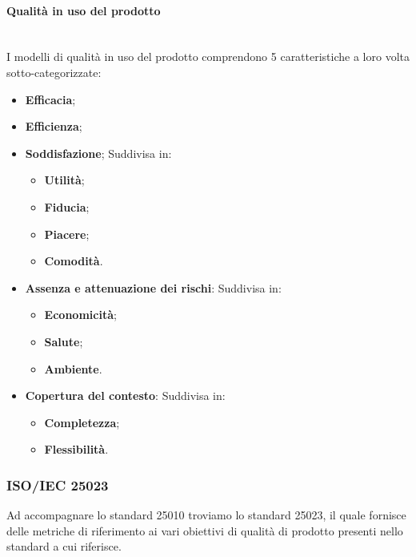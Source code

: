\paragraph {Qualità in uso del prodotto}\mbox{}\\
I modelli di qualità in uso del prodotto comprendono 5 caratteristiche a loro volta sotto-categorizzate:
\begin{itemize}
	\item \textbf{Efficacia};
	\item \textbf{Efficienza};
	\item \textbf{Soddisfazione};
	Suddivisa in:
	\begin{itemize}
		\item \textbf{Utilità};
		\item \textbf{Fiducia};
		\item \textbf{Piacere};
		\item \textbf{Comodità}.
	\end{itemize}
	\item \textbf{Assenza e attenuazione dei rischi}: Suddivisa in:
	\begin{itemize}
		\item \textbf{Economicità};
		\item \textbf{Salute};
		\item \textbf{Ambiente}.
	\end{itemize}
	\item \textbf{Copertura del contesto}: Suddivisa in:
	\begin{itemize}
		\item \textbf{Completezza};
		\item \textbf{Flessibilità}.
	\end{itemize}
\end{itemize}
\subsubsection{ISO/IEC 25023}
Ad accompagnare lo standard 25010 troviamo lo standard 25023, il quale fornisce delle metriche di riferimento ai vari obiettivi di qualità di prodotto presenti nello standard a cui riferisce.





